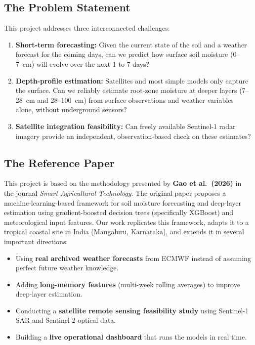 \documentclass[12pt, a4paper]{article}
\begin{document}
\subsection{The Problem Statement}

This project addresses three interconnected challenges:

\begin{enumerate}[label=(\arabic*)]
    \item \textbf{Short-term forecasting:} Given the current state of the soil and a weather forecast for the coming days, can we predict how surface soil moisture (0--7~cm) will evolve over the next 1 to 7 days?
    
    \item \textbf{Depth-profile estimation:} Satellites and most simple models only capture the surface. Can we reliably estimate root-zone moisture at deeper layers (7--28~cm and 28--100~cm) from surface observations and weather variables alone, without underground sensors?
    
    \item \textbf{Satellite integration feasibility:} Can freely available Sentinel-1 radar imagery provide an independent, observation-based check on these estimates?
\end{enumerate}

\subsection{The Reference Paper}

This project is based on the methodology presented by \textbf{Gao et al.\ (2026)} in the journal \textit{Smart Agricultural Technology}. The original paper proposes a machine-learning-based framework for soil moisture forecasting and deep-layer estimation using gradient-boosted decision trees (specifically XGBoost) and meteorological input features. Our work replicates this framework, adapts it to a tropical coastal site in India (Mangaluru, Karnataka), and extends it in several important directions:

\begin{itemize}
    \item Using \textbf{real archived weather forecasts} from ECMWF instead of assuming perfect future weather knowledge.
    \item Adding \textbf{long-memory features} (multi-week rolling averages) to improve deep-layer estimation.
    \item Conducting a \textbf{satellite remote sensing feasibility study} using Sentinel-1 SAR and Sentinel-2 optical data.
    \item Building a \textbf{live operational dashboard} that runs the models in real time.
\end{itemize}
\end{document}
